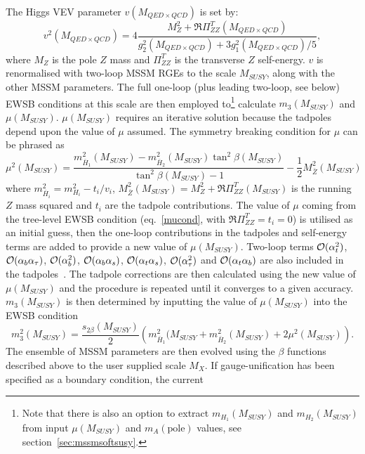 \documentclass{article}
\def\at{\alpha_t}
\def\ab{\alpha_b}
\def\as{\alpha_s}
\def\atau{\alpha_{\tau}}
\def\oatab{{\cal O}(\at\ab)}
\def\oatas{{\cal O}(\at\as)}
\def\oabas{{\cal O}(\ab\as)}
\def\oatq{{\cal O}(\at^2)}
\def\oabq{{\cal O}(\ab^2)}
\def\oatauq{{\cal O}(\atau^2)}
\def\oabatau{{\cal O}(\ab \atau)}
\begin{document}
The Higgs VEV parameter $v(M_{QED \times QCD})$ is set by:
\begin{equation}
v^2(M_{QED \times QCD}) = 4 \frac{M_Z^2 + \Re\Pi_{ZZ}^T(M_{QED \times QCD})}{g_2^2(M_{QED \times QCD}) + 3 g_1^2(M_{QED \times QCD}) / 5},
\end{equation}
where
$M_Z$ is the pole $Z$ mass and
$\Pi_{ZZ}^T$ is the transverse $Z$ self-energy. $v$ is renormalised with
two-loop MSSM RGEs to the scale $M_{SUSY}$, along with the other MSSM
parameters.  
The full one-loop (plus leading two-loop, see below) EWSB
conditions at this scale are then employed to\footnote{Note that there is also
  an option to extract $m_{H_1}(M_{SUSY})$ and $m_{H_2}(M_{SUSY})$ from input
  $\mu(M_{SUSY})$ and  
$m_A(\mbox{pole})$ values, see section~\protect\ref{sec:mssmsoftsusy}.}
calculate $m_3(M_{SUSY})$ and $\mu(M_{SUSY})$. $\mu(M_{SUSY})$ requires an iterative solution
because the tadpoles depend upon the value of $\mu$ assumed.
The symmetry breaking condition for $\mu$ can be phrased
as~\cite{Pierce:1997zz}
\begin{equation}
\mu^2(M_{SUSY}) =
\frac{m_{\bar{H}_1}^2(M_{SUSY}) -  m_{\bar{H}_2}^2(M_{SUSY}) \tan^2
  \beta(M_{SUSY})}{\tan^2 \beta(M_{SUSY}) - 1} 
- \frac{1}{2} M_{\bar Z}^2(M_{SUSY})
\label{mucond} 
\end{equation}
where $m_{\bar{H}_i}^2 = m_{H_i}^2 - t_i/v_i$, $M_{\bar Z}^2(M_{SUSY}) = M_Z^2 +
\Re\Pi_{ZZ}^T(M_{SUSY})$ is the running $Z$ mass squared and
$t_i$ are the tadpole contributions.
The value of $\mu$ coming from the tree-level EWSB
condition (eq.~\ref{mucond}, with $\Re\Pi_{ZZ}^T=t_i=0$)
is utilised as an initial guess, then the one-loop contributions in the
tadpoles and self-energy terms are added to
provide a new value of $\mu(M_{SUSY})$. Two-loop terms 
$\oatq$, $\oabatau$, $\oabq$, $\oabas$, $\oatas$, $\oatauq$ and
$\oatab$
 are also included
in the 
tadpoles~\cite{Dedes:2002dy,Dedes:2003km}. 
The tadpole corrections are then calculated
using the new value of $\mu(M_{SUSY})$ and the procedure is repeated until it
converges to a given accuracy. $m_3(M_{SUSY})$ is then determined by inputting
the value 
of $\mu(M_{SUSY})$ into the EWSB condition
\begin{equation}
m_3^2(M_{SUSY})=\frac{s_{2\beta}(M_{SUSY})}{2} \left( m_{\bar{H}_1}^2(M_{SUSY} + m_{\bar{H}_2}^2(M_{SUSY}) + 2 \mu^2(M_{SUSY})
\right). \label{Bcond}
\end{equation}
The ensemble of MSSM parameters are then evolved using the $\beta$ functions
described above to the user supplied scale $M_X$. 
If gauge-unification has been specified as a boundary condition, the current
\end{document}
